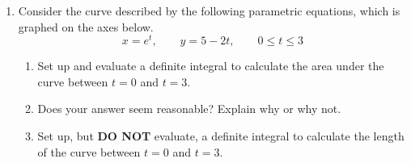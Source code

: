 \begin{enumerate}

\vfill


\item Consider the curve described by the following parametric equations, which is graphed on the axes below.
\[
x=e^t, \qquad y =5-2t, \qquad 0\leq t\leq 3
\]

\begin{enumerate}
\item Set up and evaluate a definite integral to calculate the area under the curve between \(t=0\) and \(t=3\).
\item Does your answer seem reasonable? Explain why or why not.
\item Set up, but \textbf{DO NOT} evaluate, a definite integral to calculate the length of the curve between \(t=0\) and \(t=3\).
\end{enumerate}


\end{enumerate}
